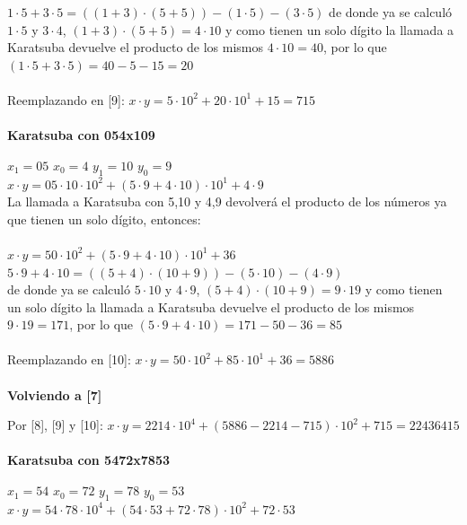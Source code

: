 \documentclass[titlepage,a4paper]{article}
\begin{document}
$1 \cdot5 + 3\cdot5 = ((1+3)\cdot (5+5)) - (1\cdot 5) - (3\cdot 5)$ de donde ya se calculó $1\cdot 5$ y $3\cdot 4$, $(1+3)\cdot (5+5) = 4\cdot10$ y como tienen un solo dígito la llamada a Karatsuba devuelve el producto de los mismos $4\cdot10=40$, por lo que $(1\cdot 5 + 3 \cdot 5) = 40 - 5 - 15 = 20 $ \\ \\ 
Reemplazando en [9]: \qquad $x\cdot y= 5 \cdot 10^2 + 20\cdot 10^1 + 15 = 715$ \\ \\


\textbf{Karatsuba con 054x109} \par
\qquad $x_1=05$ \quad $x_0=4$ \quad $y_1=10$ \quad $y_0=9$ \\
$x\cdot y= 05 \cdot 10 \cdot 10^2 + (5\cdot 9 + 4 \cdot 10)\cdot 10^1 + 4\cdot 9$ \\

La llamada a Karatsuba con 5,10 y 4,9 devolverá el producto de los números ya que tienen un solo dígito, entonces: \\ \\
$x\cdot y= 50 \cdot 10^2 + (5\cdot 9 + 4 \cdot 10)\cdot 10^1 + 36$ \qquad [10] \\

$5 \cdot9 + 4\cdot10 = ((5+4)\cdot (10+9)) - (5\cdot 10) - (4\cdot 9)$  \\ de donde ya se calculó $5\cdot 10$ y $4\cdot 9$, $(5+4)\cdot (10+9) = 9\cdot19$ y como tienen un solo dígito la llamada a Karatsuba devuelve el producto de los mismos $9\cdot19=171$, por lo que $(5\cdot 9 + 4 \cdot 10) = 171 - 50 - 36 = 85 $ \\ \\ 
Reemplazando en [10]: \qquad $x\cdot y= 50 \cdot 10^2 + 85 \cdot 10^1 + 36 = 5886$ \\ \\


\textbf{Volviendo a [7]} \par
Por [8], [9] y [10]: \qquad $x \cdot y = 2214 \cdot 10^4 + (5886 - 2214 -715) \cdot 10^2 + 715 = 22436415 $ \\ \\





\textbf{Karatsuba con  5472x7853} \par
\qquad $x_1=54$ \quad $x_0=72$ \quad $y_1=78$ \quad $y_0=53$ \\
$x\cdot y= 54 \cdot 78 \cdot 10^4 + (54\cdot 53 + 72 \cdot 78)\cdot 10^2 + 72\cdot 53$ \qquad [11] \\
\end{document}
